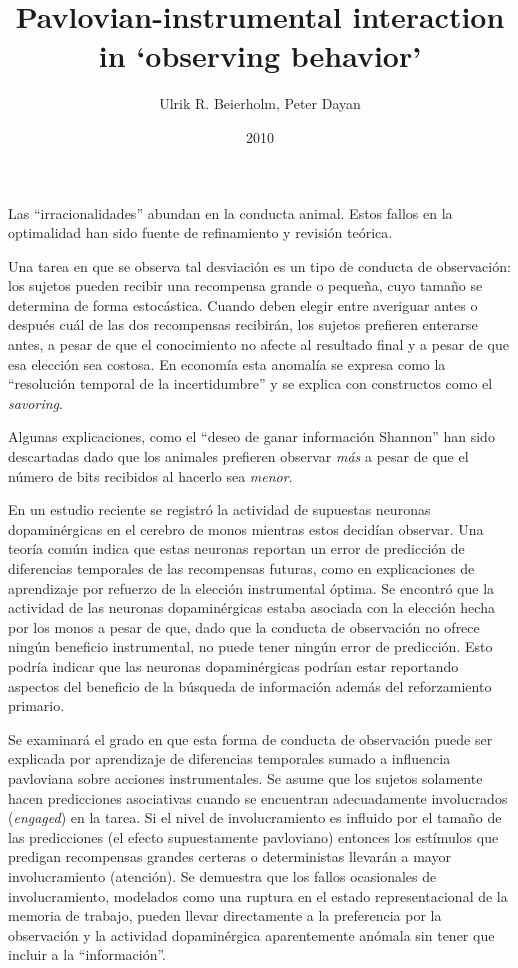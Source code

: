 \documentclass[a4paper,12pt]{article}
\title{Pavlovian-instrumental interaction in `observing behavior'}
\author{Ulrik R. Beierholm, Peter Dayan}
\date{2010}
\begin{document}
{\scshape\bfseries \maketitle}

Las ``irracionalidades'' abundan en la conducta animal. Estos fallos en la optimalidad han sido fuente de refinamiento y revisión teórica. 

Una tarea en que se observa tal desviación es un tipo de conducta de observación: los sujetos pueden recibir una recompensa grande o pequeña, cuyo tamaño se determina de forma estocástica. Cuando deben elegir entre averiguar antes o después cuál de las dos recompensas recibirán, los sujetos prefieren enterarse antes, a pesar de que el conocimiento no afecte al resultado final y a pesar de que esa elección sea costosa. En economía esta anomalía se expresa como la ``resolución temporal de la incertidumbre'' y se explica con constructos como el {\itshape savoring}.

Algunas explicaciones, como el ``deseo de ganar información Shannon'' han sido descartadas dado que los animales prefieren observar {\itshape más} a pesar de que el número de bits recibidos al hacerlo sea {\itshape menor}.

En un estudio reciente se registró la actividad de supuestas neuronas dopaminérgicas en el cerebro de monos mientras estos decidían observar. Una teoría común indica que estas neuronas reportan un error de predicción de diferencias temporales de las recompensas futuras, como en explicaciones de aprendizaje por refuerzo de la elección instrumental óptima. Se encontró que la actividad de las neuronas dopaminérgicas estaba asociada con la elección hecha por los monos a pesar de que, dado que la conducta de observación no ofrece ningún beneficio instrumental, no puede tener ningún error de predicción. Esto podría indicar que las neuronas dopaminérgicas podrían estar reportando aspectos del beneficio de la búsqueda de información además del reforzamiento primario.

Se examinará el grado en que esta forma de conducta de observación puede ser explicada por aprendizaje de diferencias temporales sumado a influencia pavloviana sobre acciones instrumentales. Se asume que los sujetos solamente hacen predicciones asociativas cuando se encuentran adecuadamente involucrados ({\itshape engaged}) en la tarea. Si el nivel de involucramiento es influido por el tamaño de las predicciones (el efecto supuestamente pavloviano) entonces los estímulos que predigan recompensas grandes certeras o deterministas llevarán a mayor involucramiento (atención). Se demuestra que los fallos ocasionales de involucramiento, modelados como una ruptura en el estado representacional de la memoria de trabajo, pueden llevar directamente a la preferencia por la observación y la actividad dopaminérgica aparentemente anómala sin tener que incluir a la ``información''. 
\end{document}
